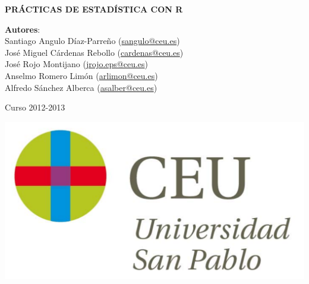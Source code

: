\documentclass[a4paper,dvips,openright,twoside]{report}
\begin{document}
\begin{titlepage}
\vspace*{5cm}
\begin{center}
{\huge \bf PRÁCTICAS DE ESTADÍSTICA CON R\par}
\vspace{0.5cm}
{\large \noindent \textbf{Autores}: \\
Santiago Angulo Díaz-Parreño (\url{sangulo@ceu.es})\\
José Miguel Cárdenas Rebollo (\url{cardenas@ceu.es})\\
José Rojo Montijano (\url{jrojo.eps@ceu.es})\\
Anselmo Romero Limón (\url{arlimon@ceu.es})\\
Alfredo Sánchez Alberca (\url{asalber@ceu.es})
}

\vspace{0.5cm}
{\large Curso 2012-2013}

\vspace{1cm}
 \includegraphics[scale=0.3]{img/logo_uspceu_01}
\end{center}
\end{titlepage}


\renewcommand{\thepage}{\roman{page}}
\setcounter{page}{1} 
\thispagestyle{plain}
\tableofcontents
\cleardoublepage
\renewcommand{\thepage}{\arabic{page}}
\setcounter{page}{1}








 





 

%
\end{document}
